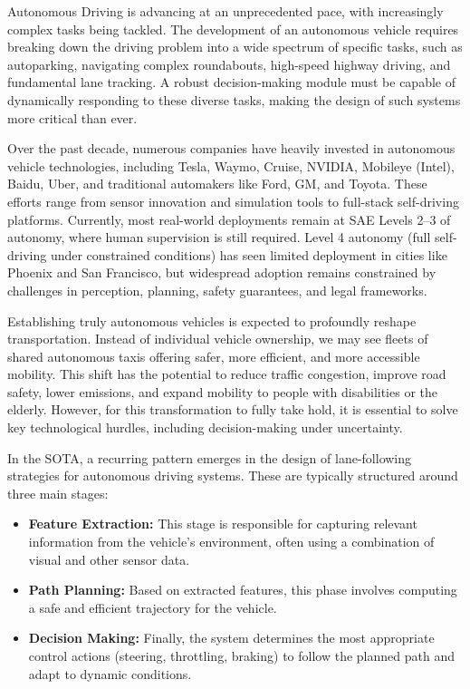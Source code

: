 \documentclass[]{interact}
\begin{document}
Autonomous Driving is advancing at an unprecedented pace, with increasingly complex tasks being tackled. The development of an autonomous vehicle requires breaking down the driving problem into a wide spectrum of specific tasks, such as autoparking, navigating complex roundabouts, high-speed highway driving, and fundamental lane tracking. A robust decision-making module must be capable of dynamically responding to these diverse tasks, making the design of such systems more critical than ever.

Over the past decade, numerous companies have heavily invested in autonomous vehicle technologies, including Tesla, Waymo, Cruise, NVIDIA, Mobileye (Intel), Baidu, Uber, and traditional automakers like Ford, GM, and Toyota. These efforts range from sensor innovation and simulation tools to full-stack self-driving platforms. Currently, most real-world deployments remain at SAE Levels 2–3 of autonomy, where human supervision is still required. Level 4 autonomy (full self-driving under constrained conditions) has seen limited deployment in cities like Phoenix and San Francisco, but widespread adoption remains constrained by challenges in perception, planning, safety guarantees, and legal frameworks.

Establishing truly autonomous vehicles is expected to profoundly reshape transportation. Instead of individual vehicle ownership, we may see fleets of shared autonomous taxis offering safer, more efficient, and more accessible mobility. This shift has the potential to reduce traffic congestion, improve road safety, lower emissions, and expand mobility to people with disabilities or the elderly. However, for this transformation to fully take hold, it is essential to solve key technological hurdles, including decision-making under uncertainty.

In the SOTA, a recurring pattern emerges in the design of lane-following strategies for autonomous driving systems. These are typically structured around three main stages:

\begin{itemize}
 \item \textbf{Feature Extraction:} This stage is responsible for capturing relevant information from the vehicle’s environment, often using a combination of visual and other sensor data.
 \item \textbf{Path Planning:} Based on extracted features, this phase involves computing a safe and efficient trajectory for the vehicle.
 \item \textbf{Decision Making:} Finally, the system determines the most appropriate control actions (steering, throttling, braking) to follow the planned path and adapt to dynamic conditions.
\end{itemize}
\end{document}
